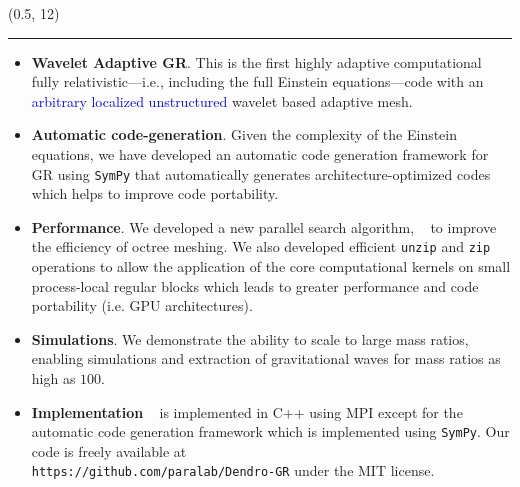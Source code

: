 \documentclass[landscape]{a0poster}
\def\Head#1{\noindent{\textbf{\huge\color{Red} #1}}\bigskip}
\begin{document}
\begin{textblock}{9}(0.5, 12)
	{\color{DarkBlue}\hrule}\medskip
	\Head{Contributions}
	\begin{itemize}
		\item \textbf{Wavelet Adaptive GR}. 
		This is the first highly adaptive computational fully relativistic---i.e., including the full Einstein equations---code with 
		an \textcolor{blue}{arbitrary localized unstructured} wavelet based adaptive mesh.
		\item \textbf{Automatic code-generation}. Given the complexity of the Einstein equations, we have developed an automatic code generation framework for GR using \texttt{SymPy} that automatically generates architecture-optimized codes which helps to improve code portability. 
		\item \textbf{Performance}. We developed a new parallel search algorithm, \tsearch~ to improve the efficiency of octree meshing. We also developed efficient \texttt{unzip} and \texttt{zip} operations to allow the application of the core computational kernels on small process-local regular blocks which leads to greater performance and code portability (i.e. GPU architectures).
		\item \textbf{Simulations}. We demonstrate the ability to scale to large mass ratios, enabling simulations and extraction of gravitational waves for mass ratios as high as $100$. 
		\item \textbf{Implementation} \dendro~ is implemented in \textsc{C++} using MPI except for the automatic code generation framework which is implemented using \texttt{SymPy}. Our code is freely available at \\ \texttt{\small https://github.com/paralab/Dendro-GR} under the MIT license.
	\end{itemize}
\end{textblock} 
\end{document}
